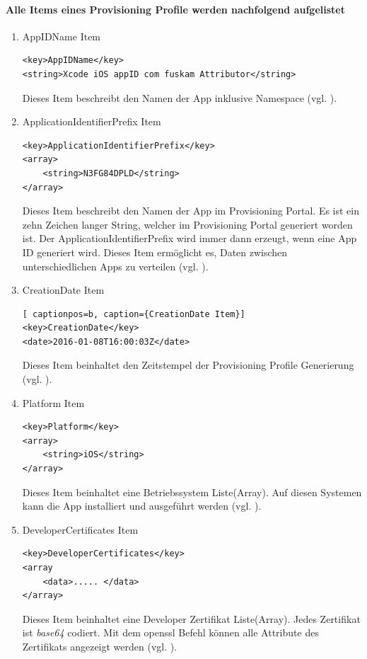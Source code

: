 \paragraph{Alle Items eines Provisioning Profile werden nachfolgend aufgelistet}
\begin{enumerate}
    \item AppIDName Item

\begin{lstlisting}[captionpos=b, caption={AppIDName Item}]
<key>AppIDName</key>
<string>Xcode iOS appID com fuskam Attributor</string>
\end{lstlisting}
Dieses Item beschreibt den Namen der App inklusive Namespace (vgl. \cite{iOSSec[5], Hacking[1]}).

    \item ApplicationIdentifierPrefix Item
\begin{lstlisting}[captionpos=b, caption={ApplicationIdentifierPrefix Item}]
<key>ApplicationIdentifierPrefix</key>
<array>
    <string>N3FG84DPLD</string>
</array>
\end{lstlisting}
Dieses Item beschreibt den Namen der App im Provisioning Portal. Es ist ein zehn Zeichen langer String, welcher im Provisioning Portal generiert worden ist. Der ApplicationIdentifierPrefix wird immer dann erzeugt, wenn eine App ID generiert wird. Dieses Item ermöglicht es, Daten zwischen unterschiedlichen Apps zu verteilen (vgl. \cite{iOSSec[5], Hacking[1]}).
    \item CreationDate Item
\begin{lstlisting}[ captionpos=b, caption={CreationDate Item}]        
<key>CreationDate</key>
<date>2016-01-08T16:00:03Z</date>
\end{lstlisting}
Dieses Item beinhaltet den Zeitstempel der Provisioning Profile Generierung (vgl. \cite{iOSSec[5], Hacking[1]}).
    \item Platform Item
\begin{lstlisting}[captionpos=b, caption={Platform Item}]        
<key>Platform</key>
<array>
    <string>iOS</string>
</array>
\end{lstlisting}
Dieses Item beinhaltet eine Betriebssystem Liste(Array). Auf diesen Systemen kann die App installiert und ausgeführt werden (vgl. \cite{iOSSec[5], Hacking[1]}).
    \item DeveloperCertificates Item
\begin{lstlisting}[captionpos=b, caption={DeveloperCertificates Item}]        
<key>DeveloperCertificates</key>
<array                
    <data>..... </data>
</array>
\end{lstlisting}
Dieses Item beinhaltet eine Developer Zertifikat Liste(Array). Jedes Zertifikat ist \textit{\glqq base64\grqq{}} codiert. Mit dem \glqq openssl\grqq{} Befehl können alle Attribute des Zertifikats angezeigt werden (vgl. \cite{iOSSec[5], Hacking[1]}). 


\end{enumerate}
